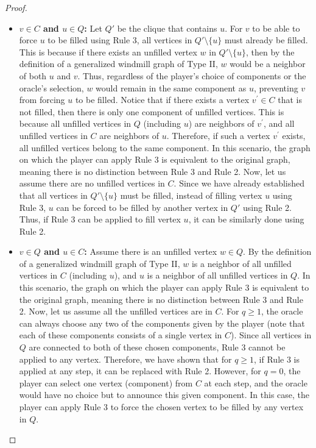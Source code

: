 \documentclass[11pt]{article}
\theoremstyle{plain}
\theoremstyle{definition}
\theoremstyle{remark}
\begin{document}
\begin{proof}
\begin{itemize}
        \item \textbf{$v \in C$ and $u \in Q$:} 
        Let $ Q' $ be the clique that contains $ u $. For $ v $ to be able to force $ u $ to be filled using Rule 3, all vertices in $ Q' \setminus \{u\} $ must already be filled. This is because if there exists an unfilled vertex $ w $ in $ Q' \setminus \{u\} $, then by the definition of a generalized windmill graph of Type II, $ w $ would be a neighbor of both $ u $ and $ v $. Thus, regardless of the player’s choice of components or the oracle’s selection, $ w $ would remain in the same component as $ u $, preventing $ v $ from forcing $ u $ to be filled. Notice that if there exists a vertex $ v^{\prime} \in C $ that is not filled, then there is only one component of unfilled vertices. This is because all unfilled vertices in $ Q $ (including $ u $) are neighbors of $ v^{\prime} $, and all unfilled vertices in $ C $ are neighbors of $ u $. Therefore, if such a vertex $ v^{\prime} $ exists, all unfilled vertices belong to the same component. In this scenario, the graph on which the player can apply Rule 3 is equivalent to the original graph, meaning there is no distinction between Rule 3 and Rule 2. Now, let us assume there are no unfilled vertices in $ C $. Since we have already established that all vertices in $ Q' \setminus \{u\} $ must be filled, instead of filling vertex $ u $ using Rule 3, $ u $ can be forced to be filled by another vertex in $ Q' $ using Rule 2. Thus, if Rule 3 can be applied to fill vertex $ u $, it can be similarly done using Rule 2.

        \item \textbf{$v \in Q$ and $u \in C$:} 
        Assume there is an unfilled vertex $ w \in Q $. By the definition of a generalized windmill graph of Type II, $ w $ is a neighbor of all unfilled vertices in $ C $ (including $ u $), and $ u $ is a neighbor of all unfilled vertices in $ Q $. In this scenario, the graph on which the player can apply Rule 3 is equivalent to the original graph, meaning there is no distinction between Rule 3 and Rule 2. Now, let us assume all the unfilled vertices are in $ C $. For $ q \geq 1 $, the oracle can always choose any two of the components given by the player (note that each of these components consists of a single vertex in $ C $). Since all vertices in $ Q $ are connected to both of these chosen components, Rule 3 cannot be applied to any vertex. Therefore, we have shown that for $q \geq 1$, if Rule 3 is applied at any step, it can be replaced with Rule 2. However, for $ q = 0 $, the player can select one vertex (component) from $ C $ at each step, and the oracle would have no choice but to announce this given component. In this case, the player can apply Rule 3 to force the chosen vertex to be filled by any vertex in $ Q $.
    \end{itemize}


\end{proof}
\end{document}
